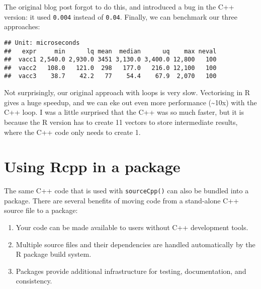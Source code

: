 The original blog post forgot to do this, and introduced a bug in the
C++ version: it used \texttt{0.004} instead of \texttt{0.04}. Finally,
we can benchmark our three approaches:

\begin{Shaded}
\begin{Highlighting}[]
\NormalTok{(}
   
   
   
\NormalTok{)}
\end{Highlighting}
\end{Shaded}

\begin{verbatim}
## Unit: microseconds
##   expr     min      lq mean  median      uq    max neval
##  vacc1 2,540.0 2,930.0 3451 3,130.0 3,400.0 12,800   100
##  vacc2   108.0   121.0  298   177.0   216.0 12,100   100
##  vacc3    38.7    42.2   77    54.4    67.9  2,070   100
\end{verbatim}

Not surprisingly, our original approach with loops is very slow.
Vectorising in R gives a huge speedup, and we can eke out even more
performance (\textasciitilde{}10x) with the C++ loop. I was a little
surprised that the C++ was so much faster, but it is because the R
version has to create 11 vectors to store intermediate results, where
the C++ code only needs to create 1.

\hypertarget{rcpp-package}{%
\section{Using Rcpp in a package}\label{rcpp-package}}

The same C++ code that is used with \texttt{sourceCpp()} can also be
bundled into a package. There are several benefits of moving code from a
stand-alone C++ source file to a package: 

\begin{enumerate}
\def\labelenumi{\arabic{enumi}.}
\item
  Your code can be made available to users without C++ development
  tools.
\item
  Multiple source files and their dependencies are handled automatically
  by the R package build system.
\item
  Packages provide additional infrastructure for testing, documentation,
  and consistency.
\end{enumerate}

